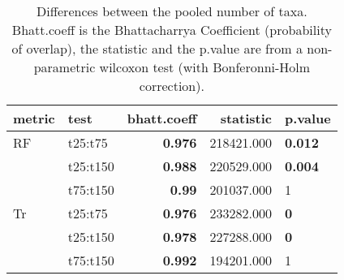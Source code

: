 \begin{table}[ht]
\centering
\begin{tabular}{llr|rl}
  \hline
metric & test & bhatt.coeff & statistic & p.value \\ 
  \hline
RF & t25:t75 & \textbf{0.976} & 218421.000 & \textbf{0.012} \\ 
   & t25:t150 & \textbf{0.988} & 220529.000 & \textbf{0.004} \\ 
   & t75:t150 & \textbf{0.99} & 201037.000 & 1 \\ 
  Tr & t25:t75 & \textbf{0.976} & 233282.000 & \textbf{0} \\ 
   & t25:t150 & \textbf{0.978} & 227288.000 & \textbf{0} \\ 
   & t75:t150 & \textbf{0.992} & 194201.000 & 1 \\ 
   \hline
\end{tabular}
\caption{Differences between the pooled number of taxa. Bhatt.coeff is the Bhattacharrya Coefficient (probability of overlap), the statistic and the p.value are from a non-parametric wilcoxon test (with Bonferonni-Holm correction).} 
\label{Tab_pooledstaxa_test}
\end{table}
